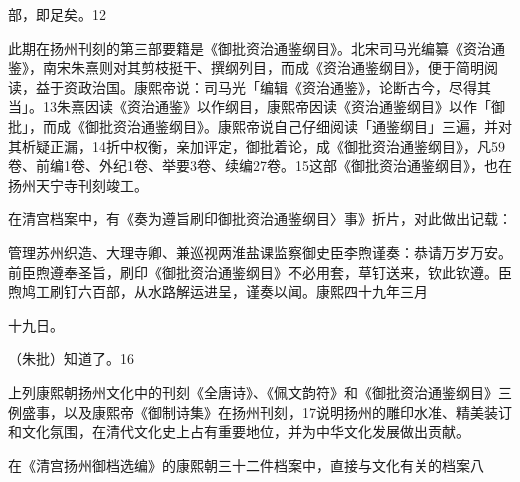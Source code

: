 \vfill
\begin{BookNotes}
\end{BookNotes}

部，即足矣。12

此期在扬州刊刻的第三部要籍是《御批资治通鉴纲目》。北宋司马光编纂《资治通鉴》，南宋朱熹则对其剪枝挺干、撰纲列目，而成《资治通鉴纲目》，便于简明阅读，益于资政治国。康熙帝说：司马光「编辑《资治通鉴》，论断古今，尽得其当」。13朱熹因读《资治通鉴》以作纲目，康熙帝因读《资治通鉴纲目》以作「御批」，而成《御批资治通鉴纲目》。康熙帝说自己仔细阅读「通鉴纲目」三遍，并对其析疑正漏，14折中权衡，亲加评定，御批着论，成《御批资治通鉴纲目》，凡59卷、前编1卷、外纪1卷、举要3卷、续编27卷。15这部《御批资治通鉴纲目》，也在扬州天宁寺刊刻竣工。

在清宫档案中，有《奏为遵旨刷印御批资治通鉴纲目〉事》折片，对此做出记载：

\begin{BookQuote}
管理苏州织造、大理寺卿、兼巡视两淮盐课监察御史臣李煦谨奏：恭请万岁万安。前臣煦遵奉圣旨，刷印《御批资治通鉴纲目》不必用套，草钉送来，钦此钦遵。臣煦鸠工刷钉六百部，从水路解运进呈，谨奏以闻。康熙四十九年三月
\end{BookQuote}

十九日。

\begin{BookQuote}
（朱批）知道了。16
\end{BookQuote}

上列康熙朝扬州文化中的刊刻《全唐诗》、《佩文韵符》和《御批资治通鉴纲目》三例盛事，以及康熙帝《御制诗集》在扬州刊刻，17说明扬州的雕印水准、精美装订和文化氛围，在清代文化史上占有重要地位，并为中华文化发展做出贡献。

在《清宫扬州御档选编》的康熙朝三十二件档案中，直接与文化有关的档案八


